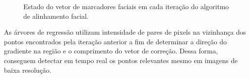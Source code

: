 \begin{figure}[ht]
    \centering
    
    \caption{Estado do vetor de marcadores faciais em cada iteração do algoritmo de alinhamento facial.}
    \label{fig:faciallm_iters}
\end{figure}

As árvores de regressão utilizam intensidade de pares de pixels na vizinhança dos pontos encontrados pela iteração anterior a fim de determinar a direção do gradiente na região e o comprimento do vetor de correção.
Dessa forma, conseguem detectar em tempo real os pontos relevantes mesmo em imagens de baixa resolução.

